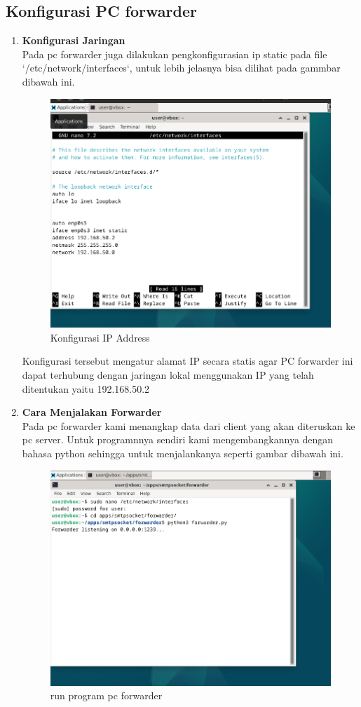 \documentclass[12pt, a4paper]{article}
\begin{document}
\subsection{Konfigurasi PC forwarder}
\begin{enumerate}
  \item \textbf{Konfigurasi Jaringan} \\
  Pada pc forwarder juga dilakukan pengkonfigurasian ip static pada file `/etc/network/interfaces`, untuk lebih jelasnya bisa dilihat pada gammbar dibawah ini.
  \begin{figure}[h]
    \centering
    \includegraphics[width=12cm]{forwarder.png}
    \caption{Konfigurasi IP Address}
  \end{figure}
  Konfigurasi tersebut mengatur alamat IP secara statis agar PC forwarder ini dapat terhubung dengan jaringan lokal menggunakan IP yang telah ditentukan yaitu 192.168.50.2
  \item \textbf{Cara Menjalakan Forwarder} \\
    Pada pc forwarder kami menangkap data dari client yang akan diteruskan ke pc server. Untuk programnnya sendiri kami mengembangkannya dengan bahasa python sehingga untuk menjalankanya seperti gambar dibawah ini.
    \begin{figure}[h]
    \centering
    \includegraphics[width=12cm]{runforward.png}
    \caption{run program pc forwarder }
  \end{figure}
  

\end{enumerate}
\end{document}
